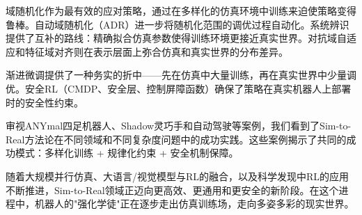 域随机化作为最有效的应对策略，通过在多样化的仿真环境中训练来迫使策略变得鲁棒。自动域随机化（ADR）进一步将随机化范围的调优过程自动化。系统辨识提供了互补的路线：精确拟合仿真参数使得训练环境更接近真实世界。对抗域自适应和特征域对齐则在表示层面上弥合仿真和真实世界的分布差异。

渐进微调提供了一种务实的折中——先在仿真中大量训练，再在真实世界中少量调优。安全RL（CMDP、安全层、控制屏障函数）确保了策略在真实机器人上部署时的安全性约束。

审视ANYmal四足机器人、Shadow灵巧手和自动驾驶等案例，我们看到了Sim-to-Real方法论在不同领域和不同复杂度问题中的成功实践。这些案例揭示了共同的成功模式：多样化训练 + 规律化约束 + 安全机制保障。

随着大规模并行仿真、大语言/视觉模型与RL的融合，以及科学发现中RL的应用不断推进，Sim-to-Real领域正迈向更高效、更通用和更安全的新阶段。在这个进程中，机器人的"强化学徒"正在逐步走出仿真训练场，走向多姿多彩的现实世界。

